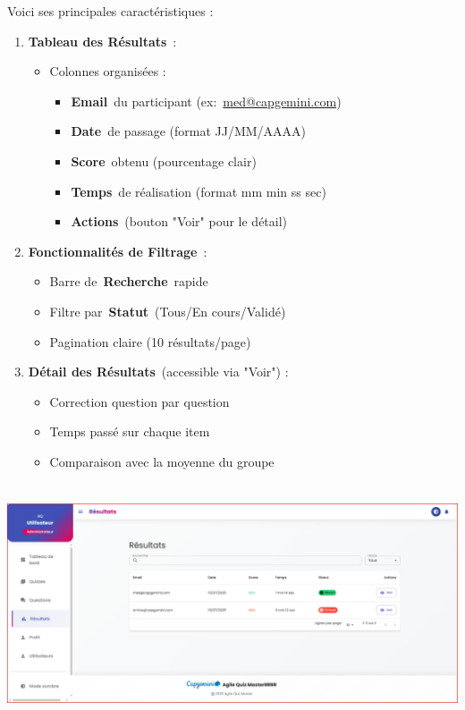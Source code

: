 \documentclass[12pt,a4paper,twoside,openright]{report}
\begin{document}
Voici ses principales caractéristiques :

\begin{enumerate}
\def\labelenumi{\arabic{enumi}.}
\item
  \textbf{Tableau des Résultats}~:

  \begin{itemize}
  \item
    Colonnes organisées :

    \begin{itemize}
    \item
      \textbf{Email}~du participant
      (ex:~\href{https://mailto:med@copgermini.com/}{med@capgemini.com})
    \item
      \textbf{Date}~de passage (format JJ/MM/AAAA)
    \item
      \textbf{Score}~obtenu (pourcentage clair)
    \item
      \textbf{Temps}~de réalisation (format mm min ss sec)
    \item
      \textbf{Actions}~(bouton "Voir" pour le détail)
    \end{itemize}
  \end{itemize}
\item
  \textbf{Fonctionnalités de Filtrage}~:

  \begin{itemize}
  \item
    Barre de~\textbf{Recherche}~rapide
  \item
    Filtre par~\textbf{Statut}~(Tous/En cours/Validé)
  \item
    Pagination claire (10 résultats/page)
  \end{itemize}
\item
  \textbf{Détail des Résultats}~(accessible via "Voir") :

  \begin{itemize}
  \item
    Correction question par question
  \item
    Temps passé sur chaque item
  \item
    Comparaison avec la moyenne du groupe
  \end{itemize}
\end{enumerate}

\includegraphics[width=6.3in,height=2.78681in]{latex_media/media/image64.png}
\end{document}

